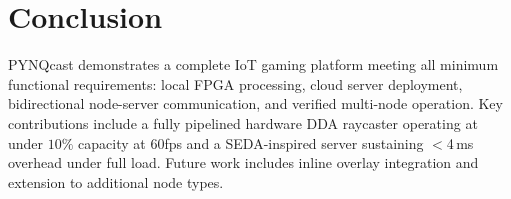 \section{Conclusion}
PYNQcast demonstrates a complete IoT gaming platform meeting all 
minimum functional requirements: local FPGA processing, cloud server 
deployment, bidirectional node-server communication, and verified 
multi-node operation. Key contributions include a fully pipelined 
hardware DDA raycaster operating at under $10\%$ capacity at 60fps and 
a SEDA-inspired server sustaining $<$4\,ms overhead under full load. 
Future work includes inline overlay integration and extension to 
additional node types.